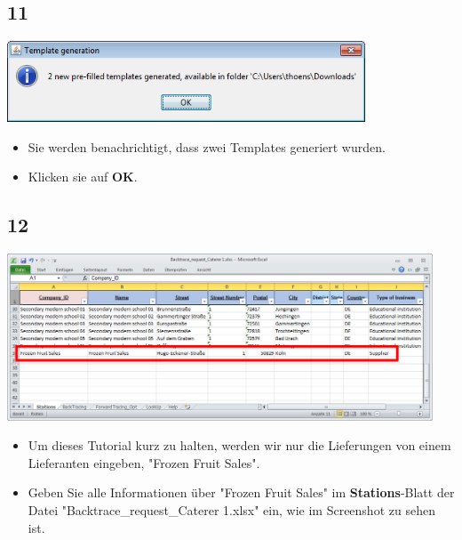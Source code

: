 \documentclass{beamer}
\begin{document}
\subsection{11}
\begin{frame}
	\begin{center}
  		\includegraphics[width=0.8\textwidth]{11.png}
	\end{center}
	\begin{itemize}
		\item Sie werden benachrichtigt, dass zwei Templates generiert wurden.
		\item Klicken sie auf \textbf{OK}.
	\end{itemize}
\end{frame}

\subsection{12}
\begin{frame}
	\begin{center}
  		\includegraphics[width=0.95\textwidth]{12.png}
	\end{center}
	\begin{itemize}
		\item Um dieses Tutorial kurz zu halten, werden wir nur die Lieferungen von einem Lieferanten eingeben, "Frozen Fruit Sales".
		\item Geben Sie alle Informationen über "Frozen Fruit Sales" im \textbf{Stations}-Blatt der Datei "Backtrace\_request\_Caterer 1.xlsx" ein, wie im Screenshot zu sehen ist.
	\end{itemize}
\end{frame}
\end{document}
